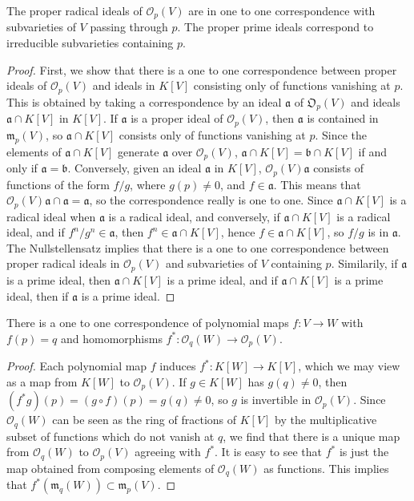 \begin{prop}
    The proper radical ideals of $\mathcal{O}_p(V)$ are in one to one correspondence with subvarieties of $V$ passing through $p$. The proper prime ideals correspond to irreducible subvarieties containing $p$.
\end{prop}
\begin{proof}
    First, we show that there is a one to one correspondence between proper ideals of $\mathcal{O}_p(V)$ and ideals in $K[V]$ consisting only of functions vanishing at $p$. This is obtained by taking a correspondence by an ideal $\mathfrak{a}$ of $\mathfrak{O}_p(V)$ and ideals $\mathfrak{a} \cap K[V]$ in $K[V]$. If $\mathfrak{a}$ is a proper ideal of $\mathcal{O}_p(V)$, then $\mathfrak{a}$ is contained in $\mathfrak{m}_p(V)$, so $\mathfrak{a} \cap K[V]$ consists only of functions vanishing at $p$. Since the elements of $\mathfrak{a} \cap K[V]$ generate $\mathfrak{a}$ over $\mathcal{O}_p(V)$, $\mathfrak{a} \cap K[V] = \mathfrak{b} \cap K[V]$ if and only if $\mathfrak{a} = \mathfrak{b}$. Conversely, given an ideal $\mathfrak{a}$ in $K[V]$, $\mathcal{O}_p(V) \mathfrak{a}$ consists of functions of the form $f/g$, where $g(p) \neq 0$, and $f \in \mathfrak{a}$. This means that $\mathcal{O}_p(V) \mathfrak{a} \cap \mathfrak{a} = \mathfrak{a}$, so the correspondence really is one to one. Since $\mathfrak{a} \cap K[V]$ is a radical ideal when $\mathfrak{a}$ is a radical ideal, and conversely, if $\mathfrak{a} \cap K[V]$ is a radical ideal, and if $f^n/g^n \in \mathfrak{a}$, then $f^n \in \mathfrak{a} \cap K[V]$, hence $f \in \mathfrak{a} \cap K[V]$, so $f/g$ is in $\mathfrak{a}$. The Nullstellensatz implies that there is a one to one correspondence between proper radical ideals in $\mathcal{O}_p(V)$ and subvarieties of $V$ containing $p$. Similarily, if $\mathfrak{a}$ is a prime ideal, then $\mathfrak{a} \cap K[V]$ is a prime ideal, and if $\mathfrak{a} \cap K[V]$ is a prime ideal, then if $\mathfrak{a}$ is a prime ideal.
\end{proof}

\begin{prop}
    There is a one to one correspondence of polynomial maps $f: V \to W$ with $f(p) = q$ and homomorphisms $f^*: \mathcal{O}_q(W) \to \mathcal{O}_p(V)$.
\end{prop}
\begin{proof}
    Each polynomial map $f$ induces $f^*: K[W] \to K[V]$, which we may view as a map from $K[W]$ to $\mathcal{O}_p(V)$. If $g \in K[W]$ has $g(q) \neq 0$, then $(f^* g)(p) = (g \circ f)(p) = g(q) \neq 0$, so $g$ is invertible in $\mathcal{O}_p(V)$. Since $\mathcal{O}_q(W)$ can be seen as the ring of fractions of $K[V]$ by the multiplicative subset of functions which do not vanish at $q$, we find that there is a unique map from $\mathcal{O}_q(W)$ to $\mathcal{O}_p(V)$ agreeing with $f^*$. It is easy to see that $f^*$ is just the map obtained from composing elements of $\mathcal{O}_q(W)$ as functions. This implies that $f^*(\mathfrak{m}_q(W)) \subset \mathfrak{m}_p(V)$.
\end{proof}

